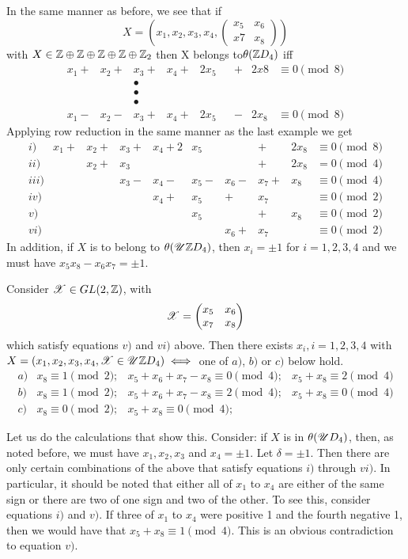 \documentclass[11pt]{report}
\begin{document}
In the same manner as before, we see that if
\[X=\left(x_1, x_2, x_3, x_4, 
\begin{pmatrix}
x_5&x_6\\
x7&x_8
\end{pmatrix}
\right)\]
with $X \in  \mathbb{Z}\oplus \mathbb{Z}\oplus
 \mathbb{Z}\oplus \mathbb{Z}\oplus \mathbb{Z}_2$ then X belongs to$\theta( \mathbb{Z}D_4)$ iff
\[\begin{matrix}
x_1+&x_2+&x_3+&x_4+&2x_5&& +&2x8&\equiv 0\pmod{8}\\
&&\bullet\\
&&\bullet\\
&&\bullet\\
x_1 - &x_2- &x_3+&x_4+&2x_5&&-&2x_8&\equiv 0\pmod{8}
\end{matrix}
\]
Applying row reduction in the same manner as the last example we 
get
\[
\begin{matrix}
        i)      &x_1+&x_2+&x_3+&x_4+2&x_5&& +&2x_8&\equiv0\pmod{8}\\
        ii)     &&x_2+&x_3&&&&   +&2x_8&=0\pmod{4}\\
        iii)    &&   &x_3 - &x_4 - &x_5 - &x_6- &x_7+&x_8&\equiv0\pmod{4}\\
        iv)     &&&&x_4+&x_5&   +&x_7&   &\equiv0\pmod{2}\\
        v)      &&&&&x_5&&      +&x_8&\equiv0\pmod{2}\\
        vi)     &&&&&&x_6+&x_7&   &\equiv0\pmod{2}
\end{matrix}
\]        
In addition, if $X$ is to belong to $\theta(\mathscr{U}{ \mathbb{Z}D_4})$, then $x_i= \pm 1$
 for $i=1,2,3,4$ and we must
have $x_5x_8-x_6x_7= \pm 1$.

Consider $\mathscr{X} \in GL(2, \mathbb{Z})$, with
\[ \mathscr{X} =\begin{pmatrix}{x_5}&{x_6}\\ {x_7}&{x_8} \end{pmatrix} \]
which satisfy equations $v)$ and $vi)$ above. Then there exists $x_i, i=1,2,3,4$
with $X=\left(x_1, x_2, x_3, x_4, \mathscr{X} \in \mathscr{U}{ \mathbb{Z}D_4}\right) \iff$ one of $a)$, 
$b)$ or $c)$ below hold.
\[\begin{matrix}
a)&x_8\equiv 1\pmod{2};& x_5+x_6+x_7-x_8\equiv 0\pmod{4};& x_5+x_8\equiv 2\pmod{4}\\
b)&x_8\equiv 1\pmod{2};& x_5+x_6+x_7-x_8\equiv 2\pmod{4};& x_5+x_8\equiv 0\pmod{4}\\
c)&x_8\equiv 0\pmod{2};& x_5+x_8\equiv 0 \pmod{4}; &
\end{matrix}
\]

Let us do the calculations that show this. Consider: if $X$ is in 
$\theta(\mathscr{U}{D_4})$, then, as noted
before, we must have $x_1,x_2,x_3$ and $x_4 = \pm 1$. Let $\delta = \pm 1$. Then 
there are only certain combinations of the above that
 satisfy equations $i)$ through $vi)$. 
In particular, it should be noted that either all of $x_1$ to $x_4$
 are either of the same sign or there are two of one sign and
two of the other. To see this, consider equations $i)$ and $v)$. If 
three of $x_1$ to $x_4$ were positive 1
and the fourth negative 1, then we would have that $x_5 + x_8 \equiv 1 \pmod{4}$. This is an obvious contradiction to equation $v)$.
\end{document}
